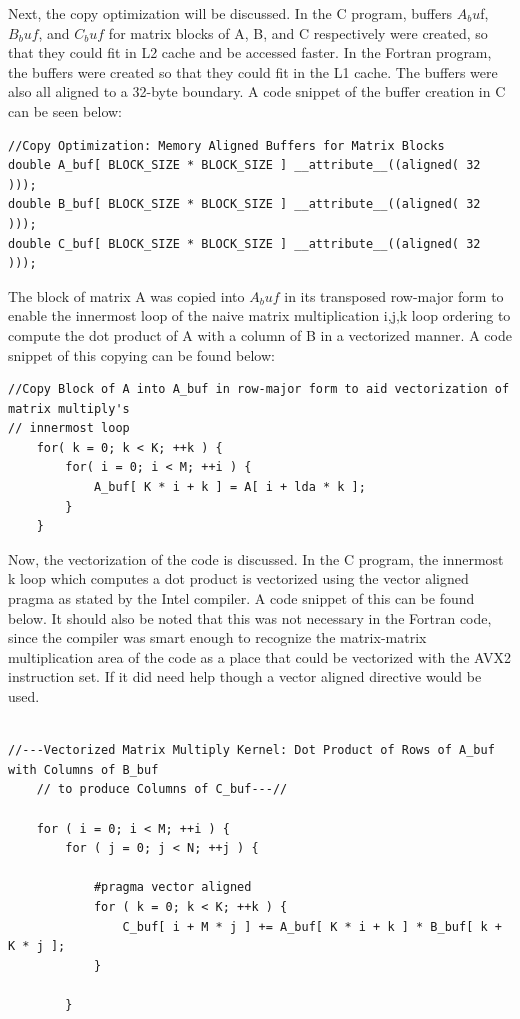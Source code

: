 \documentclass{article}
\begin{document}
Next, the copy optimization will be discussed. In the C program, buffers $A_bu$f, $B_buf$, and $C_buf$ for matrix blocks of A, B, and C respectively were created, so that they could fit in L2 cache and be accessed faster. In the Fortran program, the buffers were created so that they could fit in the L1 cache. The buffers were also all aligned to a 32-byte boundary. A code snippet of the buffer creation in C can be seen below:

\begin{verbatim}
//Copy Optimization: Memory Aligned Buffers for Matrix Blocks
double A_buf[ BLOCK_SIZE * BLOCK_SIZE ] __attribute__((aligned( 32 )));
double B_buf[ BLOCK_SIZE * BLOCK_SIZE ] __attribute__((aligned( 32 )));
double C_buf[ BLOCK_SIZE * BLOCK_SIZE ] __attribute__((aligned( 32 )));
\end{verbatim}

\noindent The block of matrix A was copied into $A_buf$ in its transposed row-major form to enable the innermost loop of the naive matrix multiplication i,j,k loop ordering to compute the dot product of A with a column of B in a vectorized manner. A code snippet of this copying can be found below:

\begin{verbatim}
//Copy Block of A into A_buf in row-major form to aid vectorization of matrix multiply's
// innermost loop
    for( k = 0; k < K; ++k ) {
        for( i = 0; i < M; ++i ) {
            A_buf[ K * i + k ] = A[ i + lda * k ];
        }
    }
\end{verbatim}

Now, the vectorization of the code is discussed. In the C program, the innermost k loop which computes a dot product is vectorized using the vector aligned pragma as stated by the Intel compiler. A code snippet of this can be found below. It should also be noted that this was not necessary in the Fortran code, since the compiler was smart enough to recognize the matrix-matrix multiplication area of the code as a place that could be vectorized with the AVX2 instruction set. If it did need help though a vector aligned directive would be used.

\begin{verbatim}

//---Vectorized Matrix Multiply Kernel: Dot Product of Rows of A_buf with Columns of B_buf
    // to produce Columns of C_buf---//
    
    for ( i = 0; i < M; ++i ) {
        for ( j = 0; j < N; ++j ) {
            
            #pragma vector aligned
            for ( k = 0; k < K; ++k ) {
                C_buf[ i + M * j ] += A_buf[ K * i + k ] * B_buf[ k + K * j ];
            }
            
        }

\end{verbatim}
\end{document}
